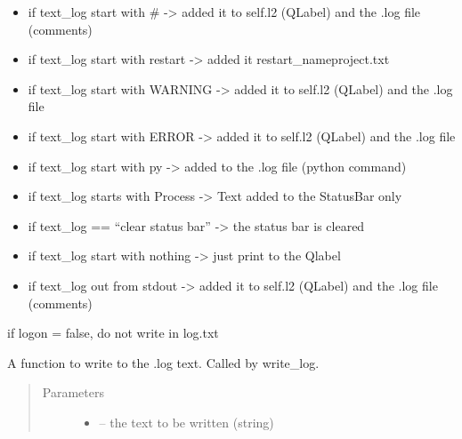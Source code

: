 \documentclass[letterpaper,10pt,english]{sphinxmanual}
\begin{document}
\begin{fulllineitems}
\begin{fulllineitems}
\begin{quote}
\begin{description}
\end{description}\end{quote}
\begin{itemize}
\item {} 
if text\_log start with \# -\textgreater{} added it to self.l2 (QLabel) and the .log file (comments)

\item {} 
if text\_log start with restart -\textgreater{} added it restart\_nameproject.txt

\item {} 
if text\_log start with WARNING -\textgreater{} added it to self.l2 (QLabel) and the .log file

\item {} 
if text\_log start with ERROR -\textgreater{} added it to self.l2 (QLabel) and the .log file

\item {} 
if text\_log start with py -\textgreater{} added to the .log file (python command)

\item {} 
if text\_log starts with Process -\textgreater{} Text added to the StatusBar only

\item {} 
if text\_log == ``clear status bar'' -\textgreater{} the status bar is cleared

\item {} 
if text\_log start with nothing -\textgreater{} just print to the Qlabel

\item {} 
if text\_log out from stdout -\textgreater{} added it to self.l2 (QLabel) and the .log file (comments)

\end{itemize}

if logon = false, do not write in log.txt

\end{fulllineitems}


\begin{fulllineitems}
\label{\detokenize{index:src_GUI.Main_windows_1.CentralW.write_log_file}}
A function to write to the .log text. Called by write\_log.
\begin{quote}\begin{description}
\item[{Parameters}] \leavevmode\begin{itemize}
\item {} 
 -- the text to be written (string)


\end{itemize}
\end{description}
\end{quote}
\end{fulllineitems}
\end{fulllineitems}
\end{document}

